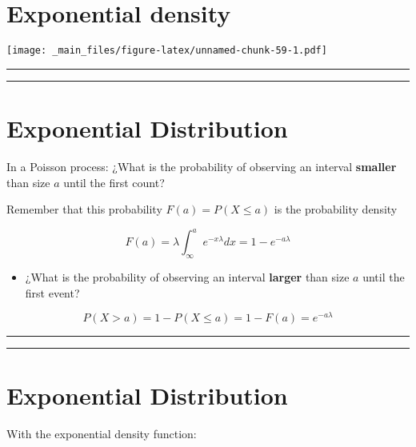 \documentclass[
]{book}
\providecommand{\tightlist}{%
  \setlength{\itemsep}{0pt}\setlength{\parskip}{0pt}}
\begin{document}
\hypertarget{exponential-density-4}{%
\section{Exponential density}\label{exponential-density-4}}

\texttt{[image: \_main\_files/figure-latex/unnamed-chunk-59-1.pdf]}

\begin{center}\rule{0.5\linewidth}{0.5pt}\end{center}

\begin{center}\rule{0.5\linewidth}{0.5pt}\end{center}

\hypertarget{exponential-distribution}{%
\section{Exponential Distribution}\label{exponential-distribution}}

In a Poisson process: ¿What is the probability of observing an interval \textbf{smaller} than size \(a\) until the first count?

Remember that this probability \(F(a)=P(X \leq a)\) is the probability density

\[F(a)=\lambda \int_\infty^a e^{-x\lambda}dx=1-e^{-a\lambda}\]

\begin{itemize}
\tightlist
\item
  ¿What is the probability of observing an interval \textbf{larger} than size \(a\) until the first event?
\end{itemize}

\[P(X > a)=1- P(X \leq a)= 1- F(a) = e^{-a\lambda}\]

\begin{center}\rule{0.5\linewidth}{0.5pt}\end{center}

\begin{center}\rule{0.5\linewidth}{0.5pt}\end{center}

\hypertarget{exponential-distribution-1}{%
\section{Exponential Distribution}\label{exponential-distribution-1}}

With the exponential density function:
\end{document}
